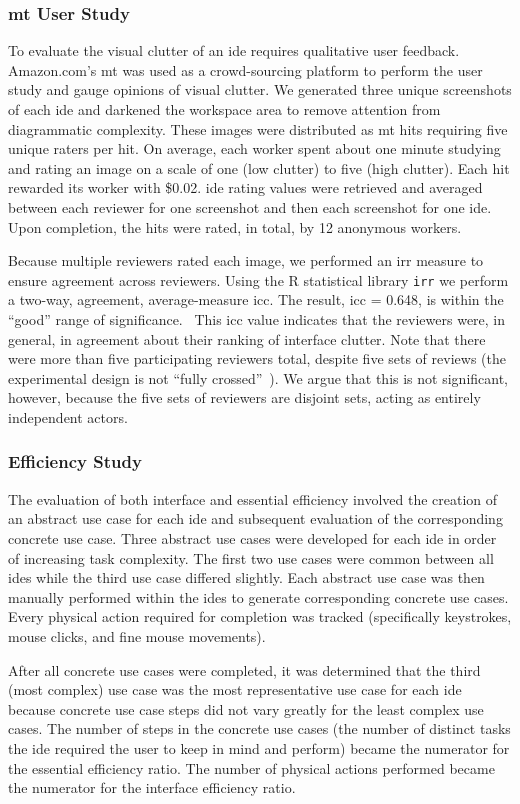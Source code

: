 \subsubsection{\acl{mt} User Study} \label{subsubsec:mturk} To evaluate the
visual clutter of an \ac{ide} requires qualitative user feedback.
Amazon.com's \ac{mt} was used as a crowd-sourcing platform to perform the
user study and gauge opinions of visual clutter. We generated three unique
screenshots of each \ac{ide} and darkened the workspace area to remove
attention from diagrammatic complexity. These images were distributed
as \ac{mt} \acp{hit} requiring five unique raters per \ac{hit}. On average,
each worker spent about one minute studying and rating an image on a scale
of one (low clutter) to five (high clutter). Each \ac{hit} rewarded its
worker with \$0.02. \ac{ide} rating values were retrieved and averaged
between each reviewer for one screenshot and then each screenshot for one
\ac{ide}. Upon completion, the \acp{hit} were rated, in total, by 12
anonymous workers.

Because multiple reviewers rated each image, we performed an \ac{irr}
measure to ensure agreement across reviewers. Using the R statistical
library \texttt{irr} we perform a two-way, agreement, average-measure
\ac{icc}. The result, \ac{icc} = 0.648, is within the ``good'' range of
significance.~\cite{cicchetti1994,hallgren2012} This \ac{icc} value
indicates that the reviewers were, in general, in agreement about their
ranking of interface clutter. Note that there were more than five
participating reviewers total, despite five sets of reviews (\ie the
experimental design is not ``fully crossed''~\cite{hallgren2012}). We argue
that this is not significant, however, because the five sets of reviewers
are disjoint sets, acting as entirely independent actors.

\subsubsection{Efficiency Study} \label{subsubsec:efficiency} The
evaluation of both interface and essential efficiency involved the creation
of an abstract use case for each \ac{ide} and subsequent evaluation of the
corresponding concrete use case. Three abstract use cases were developed
for each \ac{ide} in order of increasing task complexity. The first two use
cases were common between all \acp{ide} while the third use case differed
slightly. Each abstract use case was then manually performed within the
\acp{ide} to generate corresponding concrete use cases. Every physical
action required for completion was tracked (specifically keystrokes, mouse
clicks, and fine mouse movements).

After all concrete use cases were completed, it was determined that the
third (most complex) use case was the most representative use case for each
\ac{ide} because concrete use case steps did not vary greatly for the least
complex use cases. The number of steps in the concrete use cases (\ie the
number of distinct tasks the \ac{ide} required the user to keep in mind and
perform) became the numerator for the essential efficiency ratio. The
number of physical actions performed became the numerator for the interface
efficiency ratio.
